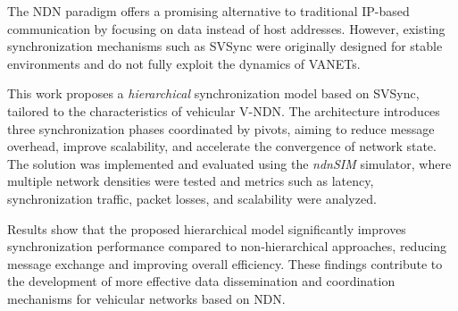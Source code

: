 
%

The \gls{NDN} paradigm offers a promising alternative to traditional IP-based communication by focusing on data instead of host addresses. However, existing synchronization mechanisms such as \gls{SVSync} were originally designed for stable environments and do not fully exploit the dynamics of \gls{VANETs}.

This work proposes a \textit{hierarchical} synchronization model based on \gls{SVSync}, tailored to the characteristics of vehicular \gls{V-NDN}. The architecture introduces three synchronization phases coordinated by pivots, aiming to reduce message overhead, improve scalability, and accelerate the convergence of network state. The solution was implemented and evaluated using the \textit{ndnSIM} simulator, where multiple network densities were tested and metrics such as latency, synchronization traffic, packet losses, and scalability were analyzed.

Results show that the proposed hierarchical model significantly improves synchronization performance compared to non-hierarchical approaches, reducing message exchange and improving overall efficiency. These findings contribute to the development of more effective data dissemination and coordination mechanisms for vehicular networks based on \gls{NDN}.




